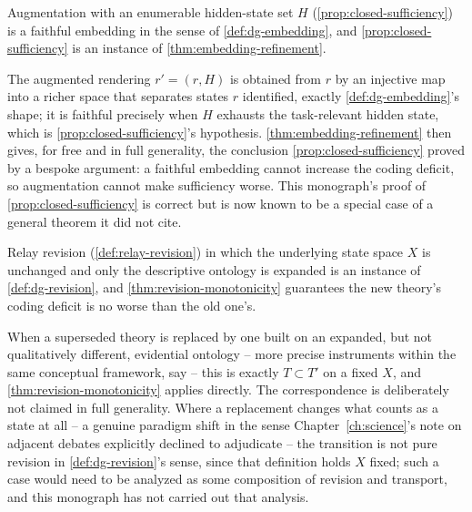 \begin{proposition}
\label{prop:augmentation-is-embedding}
Augmentation with an enumerable hidden-state set $H$
(\cref{prop:closed-sufficiency}) is a faithful embedding in the sense of
\cref{def:dg-embedding}, and \cref{prop:closed-sufficiency} is an instance of
\cref{thm:embedding-refinement}.
\end{proposition}

\begin{proofsketch}
The augmented rendering $r' = (r, H)$ is obtained from $r$ by an injective
map into a richer space that separates states $r$ identified, exactly
\cref{def:dg-embedding}'s shape; it is faithful precisely when $H$ exhausts
the task-relevant hidden state, which is \cref{prop:closed-sufficiency}'s
hypothesis. \cref{thm:embedding-refinement} then gives, for free and in full
generality, the conclusion \cref{prop:closed-sufficiency} proved by a bespoke
argument: a faithful embedding cannot increase the coding deficit, so
augmentation cannot make sufficiency worse. This monograph's proof of
\cref{prop:closed-sufficiency} is correct but is now known to be a special
case of a general theorem it did not cite.
\end{proofsketch}

\begin{proposition}
\label{prop:relay-replacement-partial-revision}
Relay revision (\cref{def:relay-revision}) in which the underlying state
space $X$ is unchanged and only the descriptive ontology is expanded is an
instance of \cref{def:dg-revision}, and \cref{thm:revision-monotonicity}
guarantees the new theory's coding deficit is no worse than the old one's.
\end{proposition}

\begin{proofsketch}
When a superseded theory is replaced by one built on an expanded, but not
qualitatively different, evidential ontology -- more precise instruments
within the same conceptual framework, say -- this is exactly $T \subset T'$
on a fixed $X$, and \cref{thm:revision-monotonicity} applies directly. The
correspondence is deliberately not claimed in full generality. Where a
replacement changes what counts as a state at all -- a genuine paradigm
shift in the sense Chapter~\ref{ch:science}'s note on adjacent debates
explicitly declined to adjudicate -- the transition is not pure revision in
\cref{def:dg-revision}'s sense, since that definition holds $X$ fixed; such a
case would need to be analyzed as some composition of revision and
transport, and this monograph has not carried out that analysis.
\end{proofsketch}

